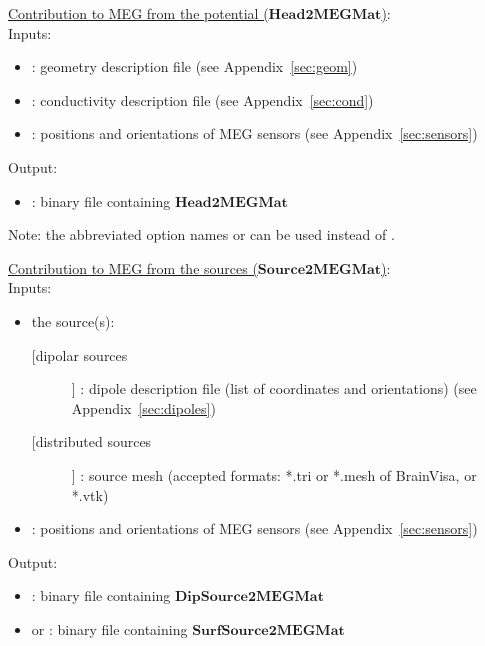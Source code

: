 \medskip

\noindent
\underline{Contribution to MEG from the potential ($\mathbf{Head2MEGMat}$)}:\\
Inputs:
\begin{itemize}
    \item {}: geometry description file (see Appendix~\ref{sec:geom})
    \item {}: conductivity description file (see Appendix~\ref{sec:cond})
    \item {}: positions and orientations of MEG sensors (see Appendix~\ref{sec:sensors})
\end{itemize}
Output:
\begin{itemize}
    \item {}: binary file containing $\mathbf{Head2MEGMat}$
\end{itemize}

\medskip

\noindent
{}
\medskip
Note:  the abbreviated option names  or  can be used instead of .

\bigskip

\noindent
\underline{Contribution to MEG from the sources ($\mathbf{Source2MEGMat}$)}:\\
Inputs:
\begin{itemize}
    \item the source(s):
    \begin{description}
        \item [[dipolar sources]] :  dipole description file (list of coordinates and orientations) (see Appendix~\ref{sec:dipoles}) 
        \item [[distributed sources]] :  source mesh (accepted formats:  *.tri or *.mesh of BrainVisa, or *.vtk) 
    \end{description}
    \item {}: positions and orientations of MEG sensors (see Appendix~\ref{sec:sensors})
\end{itemize}
Output: 
\begin{itemize}
    \item {}: binary file containing $\mathbf{DipSource2MEGMat}$ \\
\item or : binary file containing $\mathbf{SurfSource2MEGMat}$ 
\end{itemize}

